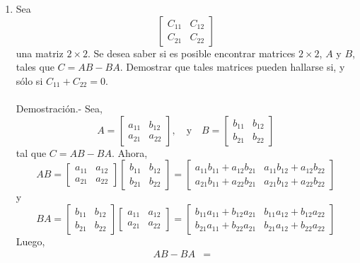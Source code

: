 \begin{enumerate}[1.]
    \item Sea
    $$\left[\begin{array}{cc}
	    C_{11} & C_{12}\\
	    C_{21} & C_{22}
    \end{array}\right]$$
    una matriz $2\times 2$. Se desea saber si es posible encontrar matrices $2\times 2$, $A$ y $B$, tales que $C=AB-BA$. Demostrar que tales matrices pueden hallarse si, y sólo si $C_{11}+C_{22}=0.$\\\\
	Demostración.-\; Sea,
	$$
	A=
	\left[\begin{array}{rr}
		a_{11} & b_{12}\\
		a_{21} & a_{22}
	\end{array}\right],
	\quad \mbox{y}\quad 	
	B=
	\left[\begin{array}{rr}
		b_{11} & b_{12}\\
		b_{21} & b_{22}
	\end{array}\right]
	$$
	tal que $C=AB-BA$. Ahora,
	$$
	AB=
	\left[\begin{array}{rr}
	    a_{11} & a_{12}\\
	    a_{21} & a_{22}
	\end{array}\right]
	\left[\begin{array}{rr}
	    b_{11} & b_{12}\\
	    b_{21} & b_{22}
	\end{array}\right]
	=
	\left[\begin{array}{rr}
	    a_{11}b_{11}+a_{12}b_{21} & a_{11}b_{12}+a_{12}b_{22}\\
	    a_{21}b_{11}+a_{22}b_{21} & a_{21}b_{12}+a_{22}b_{22}
	\end{array}\right]
	$$
	y
	$$
	BA = 
	\left[\begin{array}{rr}
	    b_{11} & b_{12}\\
	    b_{21} & b_{22}
	\end{array}\right]
	\left[\begin{array}{rr}
	    a_{11} & a_{12}\\
	    a_{21} & a_{22}
	\end{array}\right]
	=
	\left[\begin{array}{rr}
	    b_{11}a_{11}+b_{12}a_{21} & b_{11}a_{12}+b_{12}a_{22}\\
	    b_{21}a_{11}+b_{22}a_{21} & b_{21}a_{12}+b_{22}a_{22}
	\end{array}\right]
	$$
	Luego,
	$$
	\begin{array}{rcl}
	    AB-BA &=& 

\end{array}$$
\end{enumerate}
